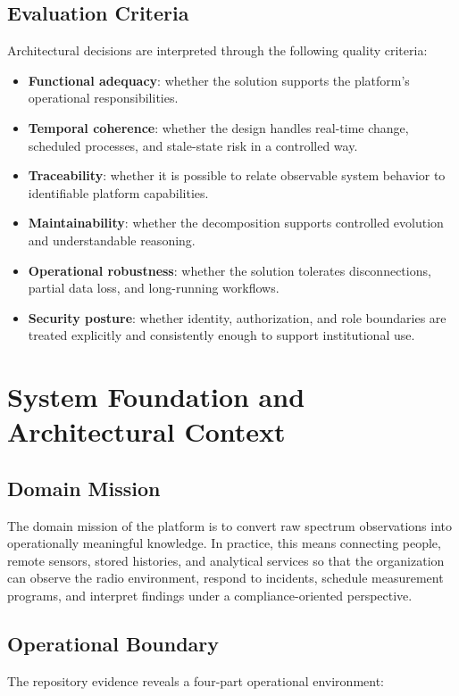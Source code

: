 \documentclass[11pt,a4paper]{article}
\begin{document}
\subsection{Evaluation Criteria}
Architectural decisions are interpreted through the following quality criteria:

\begin{itemize}
  \item \textbf{Functional adequacy}: whether the solution supports the platform's operational responsibilities.
  \item \textbf{Temporal coherence}: whether the design handles real-time change, scheduled processes, and stale-state risk in a controlled way.
  \item \textbf{Traceability}: whether it is possible to relate observable system behavior to identifiable platform capabilities.
  \item \textbf{Maintainability}: whether the decomposition supports controlled evolution and understandable reasoning.
  \item \textbf{Operational robustness}: whether the solution tolerates disconnections, partial data loss, and long-running workflows.
  \item \textbf{Security posture}: whether identity, authorization, and role boundaries are treated explicitly and consistently enough to support institutional use.
\end{itemize}

\section{System Foundation and Architectural Context}

\subsection{Domain Mission}
The domain mission of the platform is to convert raw spectrum observations into operationally meaningful knowledge. In practice, this means connecting people, remote sensors, stored histories, and analytical services so that the organization can observe the radio environment, respond to incidents, schedule measurement programs, and interpret findings under a compliance-oriented perspective.

\subsection{Operational Boundary}
The repository evidence reveals a four-part operational environment:
\end{document}
